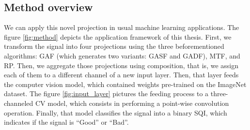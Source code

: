 
\subsection{Method overview}

We can apply this novel projection in usual machine learning applications. The figure \ref{fig:method} depicts the application framework of this thesis. First, we transform the signal into four projections using the three beforementioned algorithms: \gls{GAF} (which generates two variants: \gls{GASF} and \gls{GADF}), \gls{MTF}, and \gls{RP}. Then, we aggregate those projections using composition, that is, we assign each of them to a different channel of a new input layer. Then, that layer feeds the computer vision model, which contained weights pre-trained on the ImageNet dataset. The figure \ref{fig:input_layer} pictures the feeding process to a three-channeled \gls{CV} model, which consists in performing a point-wise convolution operation. Finally, that model classifies the signal into a binary \gls{SQI}, which indicates if the signal is ``Good'' or ``Bad''. 





